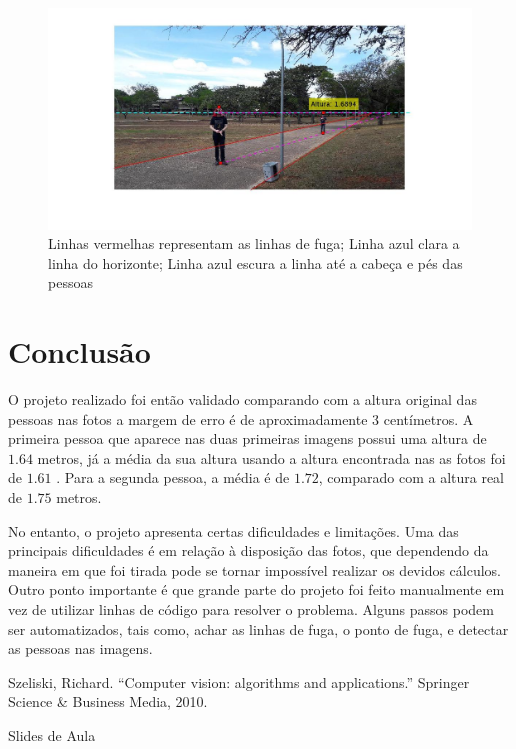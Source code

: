 \documentclass[a4paper, 12pt]{article}
\begin{document}
    \begin{figure}[H]
        \centering
        \includegraphics[width=0.95\linewidth]{lines5.jpg}
        \caption{Linhas vermelhas representam as linhas de fuga; Linha azul clara a linha do horizonte; Linha azul escura a linha até a cabeça e pés das pessoas}
    \end{figure}


    \section*{Conclusão}
        O projeto realizado foi então validado comparando com a altura original das pessoas nas fotos a margem de erro é de aproximadamente 3 centímetros. A primeira pessoa que aparece nas duas primeiras imagens possui uma altura de $1.64$ metros, já a média da sua altura usando a altura encontrada nas as fotos foi de $1.61$ . Para a segunda pessoa, a média é de $1.72$, comparado com a altura real de $1.75$ metros.

        No entanto, o projeto apresenta certas dificuldades e limitações. Uma das principais dificuldades é em relação à disposição das fotos, que dependendo da maneira em que foi tirada pode se tornar impossível realizar os devidos cálculos. Outro ponto importante é que grande parte do projeto foi feito manualmente em vez de utilizar linhas de código para resolver o problema. Alguns passos podem ser automatizados, tais como, achar as linhas de fuga, o ponto de fuga, e detectar as pessoas nas imagens.

	\begin{thebibliography}{9}

        Szeliski, Richard. ``Computer vision: algorithms and applications.'' Springer Science \& Business Media, 2010.

        Slides de Aula


    \end{thebibliography}
\end{document}
